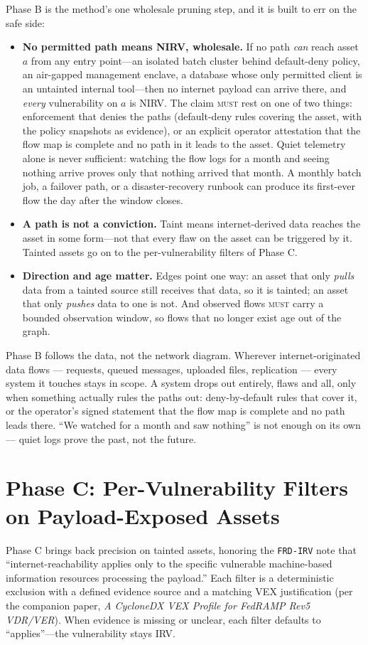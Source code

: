 \documentclass[11pt]{article}
\newcommand{\code}[1]{\texttt{#1}}
\newcommand{\rfckw}[1]{\textsc{#1}}
\begin{document}
Phase B is the method's one wholesale pruning step, and it is built to err on the safe side:
\begin{itemize}[leftmargin=1.5em, nosep]
\item \textbf{No permitted path means NIRV, wholesale.} If no path \emph{can} reach asset $a$ from any entry point---an isolated batch cluster behind default-deny policy, an air-gapped management enclave, a database whose only permitted client is an untainted internal tool---then no internet payload can arrive there, and \emph{every} vulnerability on $a$ is NIRV. The claim \rfckw{must} rest on one of two things: enforcement that denies the paths (default-deny rules covering the asset, with the policy snapshots as evidence), or an explicit operator attestation that the flow map is complete and no path in it leads to the asset. Quiet telemetry alone is never sufficient: watching the flow logs for a month and seeing nothing arrive proves only that nothing arrived that month. A monthly batch job, a failover path, or a disaster-recovery runbook can produce its first-ever flow the day after the window closes.
\item \textbf{A path is not a conviction.} Taint means internet-derived data reaches the asset in some form---not that every flaw on the asset can be triggered by it. Tainted assets go on to the per-vulnerability filters of Phase C.
\item \textbf{Direction and age matter.} Edges point one way: an asset that only \emph{pulls} data from a tainted source still receives that data, so it is tainted; an asset that only \emph{pushes} data to one is not. And observed flows \rfckw{must} carry a bounded observation window, so flows that no longer exist age out of the graph.
\end{itemize}

\begin{plain}
Phase B follows the data, not the network diagram. Wherever internet-originated data flows --- requests, queued messages, uploaded files, replication --- every system it touches stays in scope. A system drops out entirely, flaws and all, only when something actually rules the paths out: deny-by-default rules that cover it, or the operator's signed statement that the flow map is complete and no path leads there. ``We watched for a month and saw nothing'' is not enough on its own --- quiet logs prove the past, not the future.
\end{plain}

\section{Phase C: Per-Vulnerability Filters on Payload-Exposed Assets}
\label{sec:phasec}
Phase C brings back precision on tainted assets, honoring the \code{FRD-IRV} note that ``internet-reachability applies only to the specific vulnerable machine-based information resources processing the payload.'' Each filter is a deterministic exclusion with a defined evidence source and a matching VEX justification (per the companion paper, \emph{A CycloneDX VEX Profile for FedRAMP Rev5 VDR/VER}). When evidence is missing or unclear, each filter defaults to ``applies''---the vulnerability stays IRV.
\end{document}
